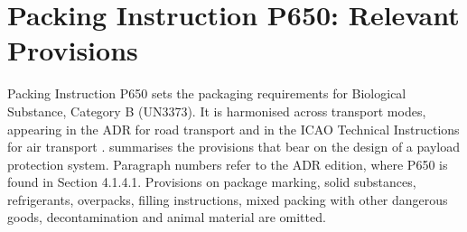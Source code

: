 \chapter{Packing Instruction P650: Relevant Provisions}
\label{appendix:p650}

Packing Instruction P650 sets the packaging requirements for Biological Substance, Category B (UN3373). It is harmonised across transport modes, appearing in the ADR for road transport \cite{ADR_2025} and in the ICAO Technical Instructions for air transport \cite{ICAO_TI_2025}.  summarises the provisions that bear on the design of a payload protection system. Paragraph numbers refer to the ADR edition, where P650 is found in Section 4.1.4.1. Provisions on package marking, solid substances, refrigerants, overpacks, filling instructions, mixed packing with other dangerous goods, decontamination and animal material are omitted.

